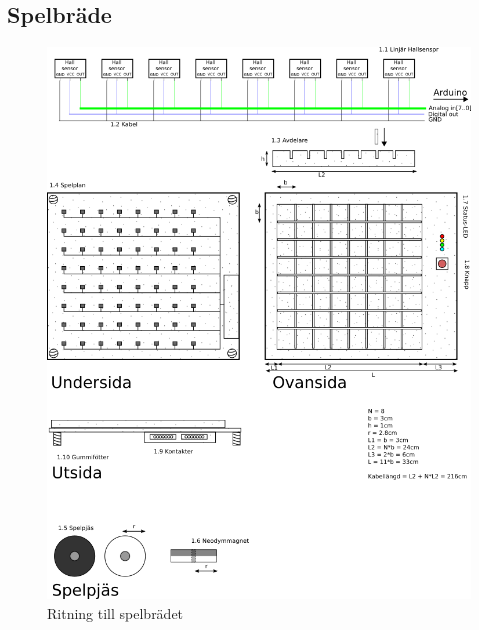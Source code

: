 \documentclass[a4paper]{article}
\begin{document}
\begin{appendix}
\subsection{Spelbräde}
\begin{figure}[!h]\label{board}
\centering
\includegraphics[scale=0.6]{board}
\caption{Ritning till spelbrädet}
\end{figure}


\end{appendix}
\end{document}
